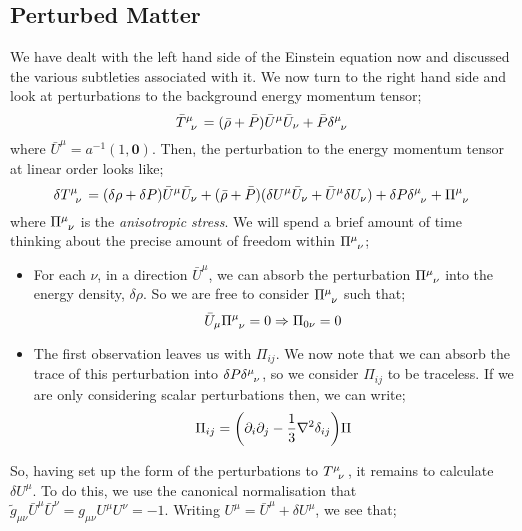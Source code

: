 \subsection{Perturbed Matter}
We have dealt with the left hand side of the Einstein equation now and discussed the various subtleties associated with it. We now turn to the right hand side and look at perturbations to the background energy momentum tensor;
\begin{equation}
\bar{T}\indices{^{\mu}_{\nu}} = (\bar{\rho} + \bar{P})\bar{U}^\mu \bar{U}_\nu + \bar{P}\delta\indices{^{\mu}_{\nu}}
\end{equation}
where $\bar{U}^\mu = a^{-1}(1, \mathbf{0})$. Then, the perturbation to the energy momentum tensor at linear order looks like;
\begin{equation}
\delta T\indices{^{\mu}_{\nu}} = (\delta \rho + \delta P)\bar{U}^\mu \bar{U}_\nu + (\bar{\rho} + \bar{P})(\delta U^{\mu}\bar{U}_\nu + \bar{U}^\mu \delta U_\nu) + \delta P \delta\indices{^{\mu}_{\nu}} + \Pi\indices{^{\mu}_{\nu}}
\end{equation}
where $\Pi\indices{^{\mu}_{\nu}}$ is the \emph{anisotropic stress}. We will spend a brief amount of time thinking about the precise amount of freedom within $\Pi\indices{^{\mu}_{\nu}}$;
\begin{itemize}
\item For each $\nu$, in a direction $\bar{U}^\mu$, we can absorb the perturbation $\Pi\indices{^{\mu}_{\nu}}$ into the energy density, $\delta \rho$. So we are free to consider $\Pi\indices{^{\mu}_{\nu}}$ such that;
\begin{equation}
\bar{U}_\mu \Pi\indices{^{\mu}_{\nu}} = 0 \Rightarrow \Pi_{0\nu} = 0
\end{equation}
\item The first observation leaves us with $\Pi_{ij}$. We now note that we can absorb the trace of this perturbation into $\delta P \delta\indices{^{\mu}_{\nu}}$, so we consider $\Pi_{ij}$ to be traceless. If we are only considering scalar perturbations then, we can write;
\begin{equation}
\Pi_{ij} = \left(\del_i \del_j - \frac{1}{3}\nabla^2 \delta_{ij}\right)\Pi
\end{equation}
\end{itemize}
So, having set up the form of the perturbations to $T\indices{^{\mu}_{\nu}}$, it remains to calculate $\delta U^{\mu}$. To do this, we use the canonical normalisation that $\tilde{g}_{\mu\nu} \bar{U}^\mu \bar{U}^\nu = g_{\mu\nu}U^\mu U^\nu = -1$. Writing $U^\mu = \bar{U}^\mu + \delta U^\mu$, we see that;
